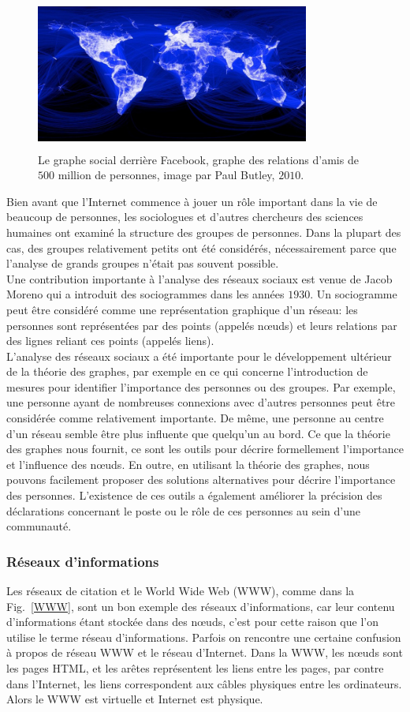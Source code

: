 \begin{figure}[h!]
\centering
\includegraphics[width=9cm,height=5cm]{./figures/facebook}
\caption{Le graphe social derrière Facebook, graphe des relations d'amis de $500$ million de personnes, image par 
Paul Butley, $2010$.}
\label{Facebook}
\end{figure}
Bien avant que l'Internet commence à jouer un rôle important dans la vie de beaucoup de personnes, les sociologues
et d'autres chercheurs des sciences humaines ont examiné la structure des groupes de personnes. Dans la plupart des
cas, des groupes relativement petits ont été considérés, nécessairement parce que l'analyse de grands groupes n'était
pas souvent possible.\\
Une contribution importante à l'analyse des réseaux sociaux est venue de Jacob Moreno qui a introduit des sociogrammes
dans les années $1930$. Un sociogramme peut être considéré comme une représentation graphique d'un réseau: les personnes
sont représentées par des points (appelés nœuds) et leurs relations par des lignes reliant ces points (appelés liens).\\
L'analyse des réseaux sociaux a été importante pour le développement ultérieur de la théorie des graphes, par exemple 
en ce qui concerne l'introduction de mesures pour identifier l'importance des personnes ou des groupes. Par exemple,
une personne ayant de nombreuses connexions avec d'autres personnes peut être considérée comme relativement importante.
De même, une personne au centre d'un réseau semble être plus influente que quelqu'un au bord. Ce que la théorie des 
graphes nous fournit, ce sont les outils pour décrire formellement l'importance et l'influence des nœuds. En outre, 
en utilisant la théorie des graphes, nous pouvons facilement proposer des solutions alternatives pour décrire 
l'importance des personnes. L'existence de ces outils a également améliorer la précision des déclarations concernant
le poste ou le rôle de ces personnes au sein d'une communauté.
 \subsubsection{Réseaux d'informations}        
 Les  réseaux de citation et le World Wide Web (WWW), comme dans la Fig.~\ref{WWW}, sont un bon exemple des réseaux d'informations, car leur contenu d'informations étant stockée dans des nœuds, c’est pour cette raison que l’on utilise le terme réseau d’informations. Parfois on rencontre une certaine confusion à propos de réseau  WWW 
 et le réseau d'Internet. Dans la WWW, les nœuds sont les pages HTML, et les arêtes représentent les liens entre 
 les pages, par contre  dans l'Internet, les liens correspondent aux câbles physiques entre les ordinateurs. Alors le WWW est virtuelle et Internet est physique.
 
